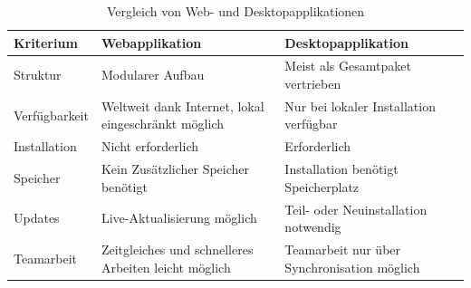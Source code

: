 \begin{table}[H]
	\centering
	{\footnotesize
	\caption{Vergleich von Web- und Desktopapplikationen \cite{TecArt-GmbH2019:online}}
	\label{tab:vergleichwebdesk}
	\begin{tabularx}{\linewidth}{l  X  X}
		\textbf{Kriterium} & \textbf{Webapplikation} & \textbf{Desktopapplikation}   \\ 
		\toprule 
		Struktur & Modularer Aufbau & Meist als Gesamtpaket vertrieben \\
		\rowcolor[HTML]{EFEFEF} 
		Verfügbarkeit & Weltweit dank Internet, \newline lokal eingeschränkt möglich & Nur bei lokaler Installation verfügbar \\ 
		
		Installation	& Nicht erforderlich & Erforderlich   \\ 
		\rowcolor[HTML]{EFEFEF} 
		Speicher & Kein Zusätzlicher Speicher benötigt & Installation benötigt Speicherplatz \\
		
		Updates & Live-Aktualisierung möglich & Teil- oder Neuinstallation notwendig \\		
		\rowcolor[HTML]{EFEFEF} 
		Teamarbeit & Zeitgleiches und schnelleres Arbeiten leicht möglich & Teamarbeit nur über Synchronisation möglich \\
		
	\end{tabularx}
	}
\end{table}

